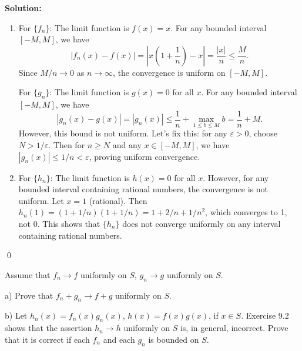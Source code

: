 \noindent\textbf{Solution:} 
\begin{enumerate}[label=(\alph*)]
\item For \(\{f_n\}\): The limit function is \( f(x) = x \). For any bounded interval \([-M, M]\), we have
\[|f_n(x) - f(x)| = \left|x \left(1 + \frac{1}{n}\right) - x\right| = \frac{|x|}{n} \leq \frac{M}{n}.\]
Since \( M/n \to 0 \) as \( n \to \infty \), the convergence is uniform on \([-M, M]\).

For \(\{g_n\}\): The limit function is \( g(x) = 0 \) for all \( x \). For any bounded interval \([-M, M]\), we have
\[|g_n(x) - g(x)| = |g_n(x)| \leq \frac{1}{n} + \max_{1 \leq b \leq M} b = \frac{1}{n} + M.\]
However, this bound is not uniform. Let's fix this: for any \( \varepsilon > 0 \), choose \( N > 1/\varepsilon \). Then for \( n \geq N \) and any \( x \in [-M, M] \), we have \( |g_n(x)| \leq 1/n < \varepsilon \), proving uniform convergence.

\item For \(\{h_n\}\): The limit function is \( h(x) = 0 \) for all \( x \). However, for any bounded interval containing rational numbers, the convergence is not uniform. Let \( x = 1 \) (rational). Then \( h_n(1) = (1 + 1/n)(1 + 1/n) = 1 + 2/n + 1/n^2 \), which converges to 1, not 0. This shows that \(\{h_n\}\) does not converge uniformly on any interval containing rational numbers.
\end{enumerate}\qed


\begin{problembox}
Assume that \( f_n \to f \) uniformly on \( S \), \( g_n \to g \) uniformly on \( S \).

a) Prove that \( f_n + g_n \to f + g \) uniformly on \( S \).

b) Let \( h_n(x) = f_n(x) g_n(x) \), \( h(x) = f(x) g(x) \), if \( x \in S \). Exercise 9.2 shows that the assertion \( h_n \to h \) uniformly on \( S \) is, in general, incorrect. Prove that it is correct if each \( f_n \) and each \( g_n \) is bounded on \( S \).
\end{problembox}

